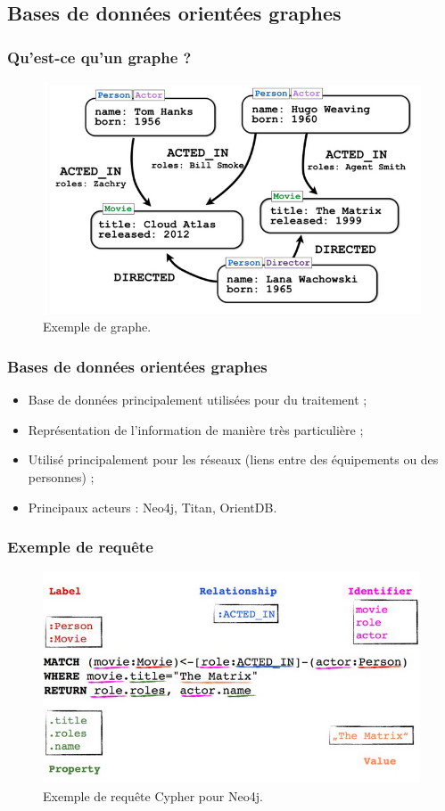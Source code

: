 	\subsection{Bases de données orientées graphes}
	\begin{frame}
		\frametitle{Qu'est-ce qu'un graphe ?}

		\begin{figure}[htb]
			\includegraphics[width=1\textwidth]{images/graphe.png}
			\caption{Exemple de graphe.}
		\end{figure}

	\end{frame}

	\begin{frame}
		\frametitle{Bases de données orientées graphes}

		\begin{itemize}
			\item Base de données principalement utilisées pour du traitement ;
			\item Représentation de l'information de manière très particulière ;
			\item Utilisé principalement pour les réseaux (liens entre des équipements ou des personnes) ;
			\item Principaux acteurs : Neo4j, Titan, OrientDB.
		\end{itemize}

	\end{frame}

	\begin{frame}
		\frametitle{Exemple de requête}

		\begin{figure}[htb]
			\includegraphics[width=1\textwidth]{images/requeteNeo4j.png}
			\caption{Exemple de requête Cypher pour Neo4j.}
		\end{figure}

	\end{frame}